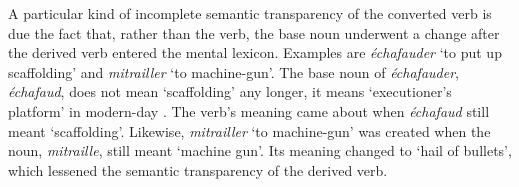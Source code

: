 \documentclass[output=paper]{langsci/langscibook}
\begin{document}
  \begin{table}
\caption{Post-morphological change along some familiar paths}
\label{tab:Schwarze:5}
\end{table}

A particular kind of incomplete semantic transparency of the converted verb is due the fact that, rather than the verb, the base noun underwent a change after the derived verb entered the mental lexicon. Examples are
\emph{échafauder} `to put up scaffolding' and \emph{mitrailler} `to machine-gun'. The base noun of \emph{échafauder}, \emph{échafaud}, does not mean `scaffolding' any longer, it means `executioner's platform' in modern-day . The verb's meaning came about when \emph{échafaud} still meant
`scaffolding'. Likewise, \emph{mitrailler} `to machine-gun' was created when the noun, \emph{mitraille}, still meant `machine gun'. Its meaning changed to `hail of bullets', which lessened the semantic transparency of the derived verb.
\end{document}

